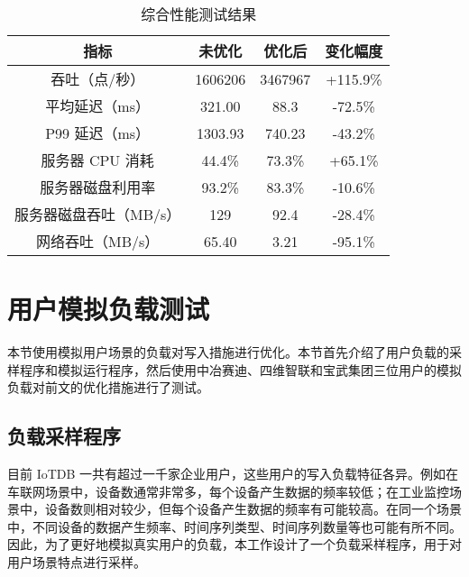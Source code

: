 \begin{table}
  \centering
  \caption{综合性能测试结果}
  \begin{tabular}{cccc}
    \toprule 
    指标 &  未优化  & 优化后 & 变化幅度 \\
    \midrule
    吞吐（点/秒） & 1606206 & 3467967 & +115.9\% \\
    平均延迟（ms） & 321.00 & 88.3 & -72.5\% \\
    P99 延迟（ms） & 1303.93 & 740.23 & -43.2\% \\
    服务器 CPU 消耗 & 44.4\% & 73.3\% & +65.1\% \\
    服务器磁盘利用率 & 93.2\% & 83.3\% & -10.6\% \\
    服务器磁盘吞吐（MB/s） & 129 & 92.4 & -28.4\% \\
    网络吞吐（MB/s） & 65.40 & 3.21 & -95.1\% \\
\bottomrule
  \end{tabular}
  \label{tabular:columnar-serialization-performance-vs-origin}
\end{table}


\section{用户模拟负载测试}
本节使用模拟用户场景的负载对写入措施进行优化。本节首先介绍了用户负载的采样程序和模拟运行程序，然后使用中冶赛迪、四维智联和宝武集团三位用户的模拟负载对前文的优化措施进行了测试。
\subsection{负载采样程序}
目前 IoTDB 一共有超过一千家企业用户，这些用户的写入负载特征各异。例如在车联网场景中，设备数通常非常多，每个设备产生数据的频率较低；在工业监控场景中，设备数则相对较少，但每个设备产生数据的频率有可能较高。在同一个场景中，不同设备的数据产生频率、时间序列类型、时间序列数量等也可能有所不同。因此，为了更好地模拟真实用户的负载，本工作设计了一个负载采样程序，用于对用户场景特点进行采样。

